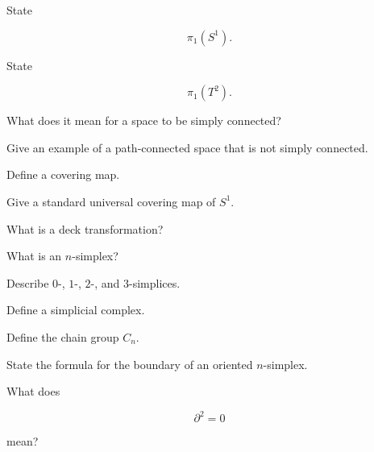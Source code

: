 \begin{exercise}[1]
State

\[
\pi_1(S^1).
\]
\end{exercise}

\begin{exercise}[1]
State

\[
\pi_1(T^2).
\]
\end{exercise}

\begin{exercise}[1]
What does it mean for a space to be simply connected?
\end{exercise}

\begin{exercise}[1]
Give an example of a path-connected space that is not simply connected.
\end{exercise}

\begin{exercise}[1]
Define a covering map.
\end{exercise}

\begin{exercise}[1]
Give a standard universal covering map of \(S^1\).
\end{exercise}

\begin{exercise}[1]
What is a deck transformation?
\end{exercise}

\begin{exercise}[1]
What is an \(n\)-simplex?
\end{exercise}

\begin{exercise}[1]
Describe \(0\)-, \(1\)-, \(2\)-, and \(3\)-simplices.
\end{exercise}

\begin{exercise}[1]
Define a simplicial complex.
\end{exercise}

\begin{exercise}[1]
Define the chain group \(C_n\).
\end{exercise}

\begin{exercise}[1]
State the formula for the boundary of an oriented \(n\)-simplex.
\end{exercise}

\begin{exercise}[1]
What does

\[
\partial^2=0
\]

mean?
\end{exercise}

